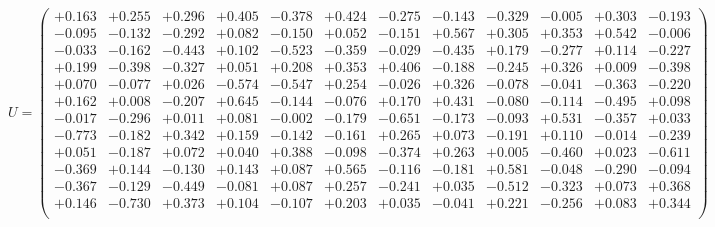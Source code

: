 \documentclass[9pt]{article}
\theoremstyle{plain}
\theoremstyle{definition}
\theoremstyle{remark}
\numberwithin{equation}{section}
\begin{document}
$U = \left(
\begin{array}{
cccccccccccc}
+0.163 & +0.255 & +0.296 & +0.405 & -0.378 & +0.424 & -0.275 & -0.143 & -0.329 & -0.005 & +0.303 & -0.193 \\
-0.095 & -0.132 & -0.292 & +0.082 & -0.150 & +0.052 & -0.151 & +0.567 & +0.305 & +0.353 & +0.542 & -0.006 \\
-0.033 & -0.162 & -0.443 & +0.102 & -0.523 & -0.359 & -0.029 & -0.435 & +0.179 & -0.277 & +0.114 & -0.227 \\
+0.199 & -0.398 & -0.327 & +0.051 & +0.208 & +0.353 & +0.406 & -0.188 & -0.245 & +0.326 & +0.009 & -0.398 \\
+0.070 & -0.077 & +0.026 & -0.574 & -0.547 & +0.254 & -0.026 & +0.326 & -0.078 & -0.041 & -0.363 & -0.220 \\
+0.162 & +0.008 & -0.207 & +0.645 & -0.144 & -0.076 & +0.170 & +0.431 & -0.080 & -0.114 & -0.495 & +0.098 \\
-0.017 & -0.296 & +0.011 & +0.081 & -0.002 & -0.179 & -0.651 & -0.173 & -0.093 & +0.531 & -0.357 & +0.033 \\
-0.773 & -0.182 & +0.342 & +0.159 & -0.142 & -0.161 & +0.265 & +0.073 & -0.191 & +0.110 & -0.014 & -0.239 \\
+0.051 & -0.187 & +0.072 & +0.040 & +0.388 & -0.098 & -0.374 & +0.263 & +0.005 & -0.460 & +0.023 & -0.611 \\
-0.369 & +0.144 & -0.130 & +0.143 & +0.087 & +0.565 & -0.116 & -0.181 & +0.581 & -0.048 & -0.290 & -0.094 \\
-0.367 & -0.129 & -0.449 & -0.081 & +0.087 & +0.257 & -0.241 & +0.035 & -0.512 & -0.323 & +0.073 & +0.368 \\
+0.146 & -0.730 & +0.373 & +0.104 & -0.107 & +0.203 & +0.035 & -0.041 & +0.221 & -0.256 & +0.083 & +0.344 \\
\end{array}
\right)$ \newline 
\end{document}
